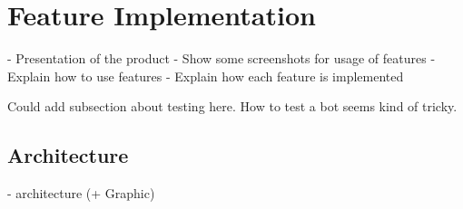 \section{Feature Implementation}

-	Presentation of the product
-	Show some screenshots for usage of features
-	Explain how to use features
-	Explain how each feature is implemented


Could add subsection about testing here.
How to test a bot seems kind of tricky.


\subsection{Architecture}

- architecture (+ Graphic)
